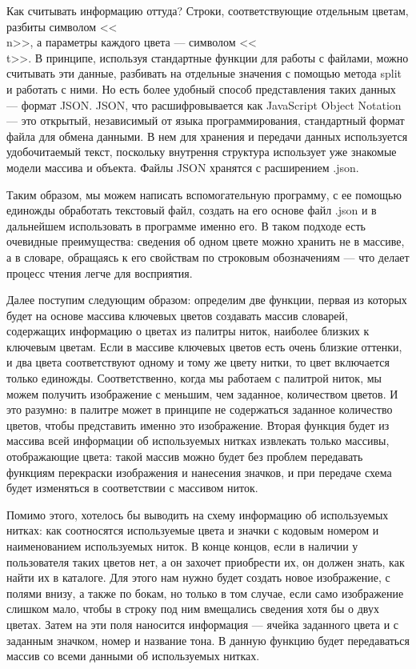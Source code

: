\documentclass[12pt]{article}
\begin{document}
{	Как считывать информацию оттуда? Строки, соответствующие отдельным цветам, разбиты символом <<\\n>>, а параметры каждого цвета --- символом <<\\t>>. В принципе, используя стандартные функции для работы с файлами, можно считывать эти данные, разбивать на отдельные значения с помощью метода split и работать с ними. Но есть более удобный способ представления таких данных --- формат JSON. JSON, что расшифровывается как JavaScript Object Notation — это открытый, независимый от языка программирования, стандартный формат файла для обмена данными. В нем для хранения и передачи данных используется удобочитаемый текст, поскольку внутрення структура использует уже знакомые модели массива и объекта. Файлы JSON хранятся с расширением .json. 

	Таким образом, мы можем написать вспомогательную программу, с ее помощью единожды обработать текстовый файл, создать на его основе файл .json и в дальнейшем использовать в программе именно его. В таком подходе есть очевидные преимущества: сведения об одном цвете можно хранить не в массиве, а в словаре, обращаясь к его свойствам по строковым обозначениям --- что делает процесс чтения легче для восприятия.
	
	
	
	Далее поступим следующим образом: определим две функции, первая из которых будет на основе массива ключевых цветов создавать массив словарей, содержащих информацию о цветах из палитры ниток, наиболее близких к ключевым цветам. Если в массиве ключевых цветов есть очень близкие оттенки, и два цвета соответствуют одному и тому же цвету нитки, то цвет включается только единожды. Соответственно, когда мы работаем с палитрой ниток, мы можем получить изображение с меньшим, чем заданное, количеством цветов. И это разумно: в палитре может в принципе не содержаться заданное количество цветов, чтобы представить именно это изображение. Вторая функция будет из массива всей информации об используемых нитках извлекать только массивы, отображающие цвета: такой массив можно будет без проблем передавать функциям перекраски изображения и нанесения значков, и при передаче схема будет изменяться в соответствии с массивом ниток.
	
	
	
	Помимо этого, хотелось бы выводить на схему информацию об используемых нитках: как соотносятся используемые цвета и значки с кодовым номером и наименованием используемых ниток. В конце концов, если в наличии у пользователя таких цветов нет, а он захочет приобрести их, он должен знать, как найти их в каталоге. Для этого нам нужно будет создать новое изображение, с полями внизу, а также по бокам, но только в том случае, если само изображение слишком мало, чтобы в строку под ним вмещались сведения хотя бы о двух цветах. Затем на эти поля наносится информация --- ячейка заданного цвета и с заданным значком, номер и название тона.	В данную функцию будет передаваться массив со всеми данными об используемых нитках.
	
}
\end{document}

